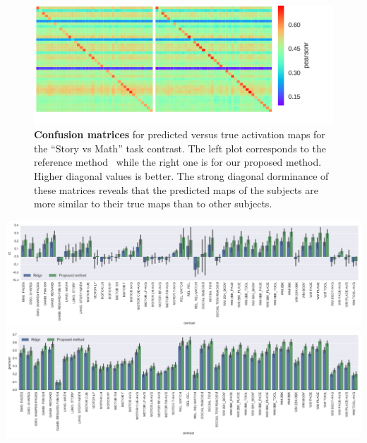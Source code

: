 \begin{figure}
  \includegraphics[width=1\linewidth]{figures/confusion_STORY-MATH.png}
  \caption{\textbf{Confusion matrices} for predicted versus true activation maps for
    the ``Story vs Math'' task contrast. The left plot corresponds to the reference
    method~\citep{tavor2016task} while the right one is for our proposed method.
      Higher diagonal values is better.
      The strong diagonal dorminance of these matrices reveals that the predicted maps of the subjects are more similar to their true maps than to other subjects.
      }
\label{fig:confusion}
\end{figure}

\begin{pagefigure}%
  \includegraphics[width=1\linewidth]{figures/all_r2.png}
  \includegraphics[width=1\linewidth]{figures/all_pearsonr.png}
  \caption{\textbf{Top:} $R^2$-score for predicting subject-specific activation maps for different task contrasts, from their resting data. These results are for the different contrasts of the HCP dataset~\citep{VanEssen20122222} are shown.
    Results for the reference method \citep{tavor2016task} are also shown.
    \textbf{Bottom:} Pearson correlation for the same prediction problem.
  }
  \label{fig:confusion_boxplots}
\end{pagefigure}


